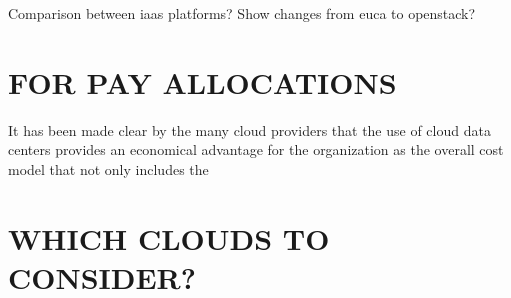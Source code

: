 \documentclass{sig-alternate}
\begin{document}
% 

Comparison between iaas platforms?
Show changes from euca to openstack?

\section{FOR PAY ALLOCATIONS}

It has been made clear by the many cloud providers that the use of cloud data centers provides an economical advantage for the organization as the overall cost model that not only includes the 

\section{WHICH CLOUDS TO CONSIDER?}
\end{document}
